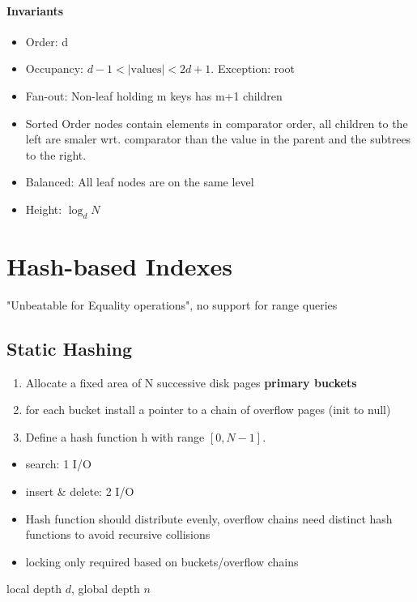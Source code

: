 \paragraph{Invariants}
\begin{itemize}
    \item Order: d
    \item Occupancy: $d-1 < |\text{values}| < 2d+1$. Exception: root
    \item Fan-out: Non-leaf holding m keys has m+1 children
    \item Sorted Order nodes contain elements in comparator order, all children to the left are smaler wrt. comparator than the value in the parent and the subtrees to the right.
    \item Balanced: All leaf nodes are on the same level
    \item Height: $\log_d N$
\end{itemize}


 \section{Hash-based Indexes}
 "Unbeatable for Equality operations", no support for range queries
 
 \subsection{Static Hashing}
\begin{enumerate}
    \item Allocate a fixed area of N successive disk pages \textbf{primary buckets} 
    \item for each bucket install a pointer to a chain of overflow pages (init to null)
    \item Define a hash function h with range $[0,N-1]$. 
\end{enumerate}
\begin{itemize}
    \item search: 1 I/O
    \item insert \& delete: 2 I/O
    \item Hash function should distribute evenly, overflow chains need distinct hash functions to avoid recursive collisions
    \item locking only required based on buckets/overflow chains
\end{itemize}
local depth $d$, global depth $n$

